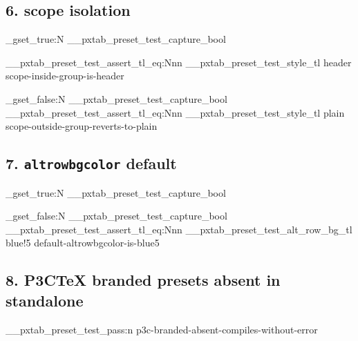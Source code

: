 \documentclass{article}
\begin{document}
\subsection*{6. \texttt{\string\pxTABusepreset} scope isolation}

\ExplSyntaxOn
\bool_gset_true:N \g__pxtab_preset_test_capture_bool
\ExplSyntaxOff

\begingroup
\endgroup

\ExplSyntaxOn
\__pxtab_preset_test_assert_tl_eq:Nnn
  \g__pxtab_preset_test_style_tl { header }
  { scope-inside-group-is-header }
\ExplSyntaxOff


\ExplSyntaxOn
\bool_gset_false:N \g__pxtab_preset_test_capture_bool
\__pxtab_preset_test_assert_tl_eq:Nnn
  \g__pxtab_preset_test_style_tl { plain }
  { scope-outside-group-reverts-to-plain }
\ExplSyntaxOff

\subsection*{7. \texttt{altrowbgcolor} default}

\ExplSyntaxOn
\bool_gset_true:N \g__pxtab_preset_test_capture_bool
\ExplSyntaxOff


\ExplSyntaxOn
\bool_gset_false:N \g__pxtab_preset_test_capture_bool
\__pxtab_preset_test_assert_tl_eq:Nnn
  \g__pxtab_preset_test_alt_row_bg_tl { blue!5 }
  { default-altrowbgcolor-is-blue5 }
\ExplSyntaxOff

\subsection*{8. P3CTeX branded presets absent in standalone}


\ExplSyntaxOn
\__pxtab_preset_test_pass:n { p3c-branded-absent-compiles-without-error }
\ExplSyntaxOff
\end{document}
